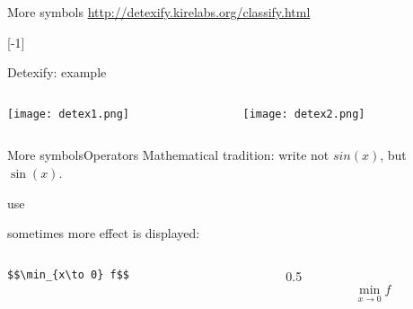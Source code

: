 \begin{frame}[fragile]{More symbols}\relax
    {\Large \url{http://detexify.kirelabs.org/classify.html}}
    
    [-1]
    
\end{frame}

\begin{frame}{Detexify: example}\relax

    \begin{columns}
        \begin{column}{0.45\textwidth}
             \texttt{[image: detex1.png]}
        \end{column}
        \begin{column}{0.45\textwidth}
             \texttt{[image: detex2.png]}
        \end{column}
    \end{columns}    
    
\end{frame}

\outclassframe{

}

\begin{frame}[fragile]{More symbols}{Operators}\relax
Mathematical tradition: write not $sin (x)$, but {\csk$\sin (x)$}.\inpause

\begin{center}
     \Large use \ccol{\sin}
\end{center}
\inpause
sometimes more effect is displayed:
\begin{columns}

\begin{column}{0.5\textwidth}
\hfill\lstinline[basicstyle=\tt]|$$\min_{x\to 0} f$$|     
\end{column}
\begin{column}{0.5\textwidth}
$$\min_{x\to 0} f$$
\end{column}
\end{columns}


\end{frame}


